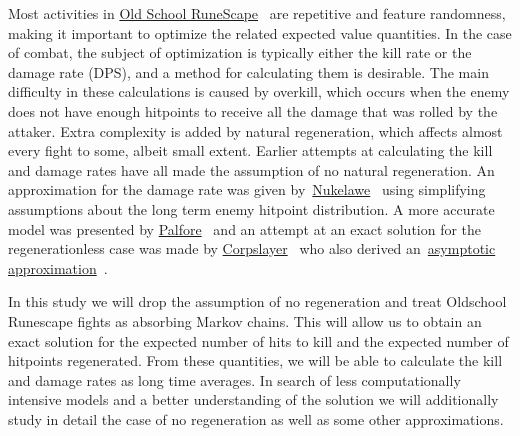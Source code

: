 Most activities in \href{https://oldschool.runescape.com}{Old School RuneScape}~\cite{osrs} are repetitive and feature randomness, making it important to optimize the related expected value quantities. In the case of combat, the subject of optimization is typically either the kill rate or the damage rate (DPS), and a method for calculating them is desirable. The main difficulty in these calculations is caused by overkill, which occurs when the enemy does not have enough hitpoints to receive all the damage that was rolled by the attaker. Extra complexity is added by natural regeneration, which affects almost every fight to some, albeit small extent.
Earlier attempts at calculating the kill and damage rates have all made the assumption of no natural regeneration. An approximation for the damage rate was given by~\href{https://imgur.com/aykEahg}{Nukelawe}~\cite{nukelawe} using simplifying assumptions about the long term enemy hitpoint distribution. A more accurate model was presented by \href{https://www.reddit.com/r/2007scape/comments/faz5et/the_mathematics_of_osrs_combat/}{Palfore}~\cite{palfore} and an attempt at an exact solution for the regenerationless case was made by \href{https://www.reddit.com/r/2007scape/comments/bcq3mj/overkill_dps_formulas}{Corpslayer}~\cite{corpslayer1} who also derived an~\href{https://imgur.com/a/6613Tlu}{asymptotic approximation}~\cite{corpslayer2}.

In this study we will drop the assumption of no regeneration and treat Oldschool Runescape fights as absorbing Markov chains. This will allow us to obtain an exact solution for the expected number of hits to kill and the expected number of hitpoints regenerated. From these quantities, we will be able to calculate the kill and damage rates as long time averages. In search of less computationally intensive models and a better understanding of the solution we will additionally study in detail the case of no regeneration as well as some other approximations.
